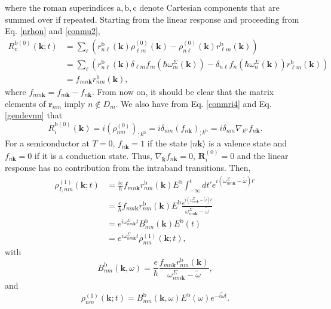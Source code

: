 where the roman superindices
$\mathrm{a},\mathrm{b},\mathrm{c}$ denote Cartesian components that are summed over if repeated.
Starting from the linear response and proceeding from Eq. \eqref{nrhon} and  \eqref{conmu2},
\begin{align}\label{R0e}
R_e^{\mathrm{b}(0)}(\mathbf{k};t)
&=
\sum_{\ell}
\left(
r^{\mathrm{b}}_{n\ell}(\mathbf{k})
\rho^{(0)}_{\ell m}(\mathbf{k})
-
\rho^{(0)}_{n\ell}(\mathbf{k})
r^{\mathrm{b}}_{\ell m}(\mathbf{k})
\right)
\nonumber \\
&=
\sum_{\ell}
\left(
r^{\mathrm{b}}_{n\ell}(\mathbf{k})
\delta_{\ell m}f_m(\hbar\omega^\Sigma_m(\mathbf{k}))
-
\delta_{n\ell}f_n(\hbar\omega^{\Sigma}_{n}(\mathbf{k}))
r^{\mathrm{b}}_{\ell m}(\mathbf{k})
\right)
\nonumber \\
&=
f_{mn\mathbf{k}}
r^{\mathrm{b}}_{nm}(\mathbf{k})
,
\end{align}
where $f_{mn\mathbf{k}}=f_{m\mathbf{k}}-f_{n\mathbf{k}}$.
From now on,
it should be clear that the matrix elements of $\mathbf{r}_{nm}$ imply
$n\notin D_m$.
We also have from Eq. \eqref{conmri4} and Eq. \eqref{gendevnn} that
\begin{equation}\label{R0i}
R_i^{\mathrm{b}(0)}(\mathbf{k})=i(\rho^{(0)}_{nm})_{;k^{\mathrm{b}}}=i\delta_{nm}(f_{n\mathbf{k}})_{;k^{\mathrm{b}}}=i\delta_{nm}\nabla_{k^{\mathrm{b}}} f_{n\mathbf{k}}
.
\end{equation}
For a semiconductor at $T = 0$, $f_{n\mathbf{k}} = 1$ if the state
$|n\mathbf{k}\rangle$ is a valence state and $f_{n\mathbf{k}} = 0$ if it is a
conduction state. Thus, $\nabla_\mathbf{k} f_{n\mathbf{k}} = 0$,
$\mathbf{R}_i^{(0)} = 0$ and the linear response has no contribution from the
intraband transitions. Then,
\begin{align}\label{rtilde2n}
\rho^{(1)}_{I,nm}(\mathbf{k};t)
&=\frac{ie}{\hbar}
f_{mn\mathbf{k}}
r^{\mathrm{b}}_{nm}(\mathbf{k})E^{\mathrm{b}}
\int_{-\infty}^t dt'
e^{i(\omega^\Sigma_{nm\mathbf{k}}-\tilde{\omega})t'}
\nonumber \\
&=\frac{e}{\hbar}
f_{mn\mathbf{k}}
r^{\mathrm{b}}_{nm}(\mathbf{k})E^{\mathrm{b}}
\frac{e^{i(\omega^\Sigma_{nm\mathbf{k}}-\tilde{\omega})t}}
{\omega^\Sigma_{nm\mathbf{k}}-\tilde{\omega}}
\nonumber \\
&=
e^{i\omega^\Sigma_{nm\mathbf{k}}t}
B^{\mathrm{b}}_{mn}(\mathbf{k})E^{\mathrm{b}}(t)
\nonumber \\
&=
e^{i\omega^\Sigma_{nm\mathbf{k}}t}
\rho^{(1)}_{nm}(\mathbf{k};t)
,
\end{align}
with
\begin{equation}\label{rho1} 
B^{\mathrm{b}}_{nm}(\mathbf{k},\omega)=
\frac{e}{\hbar}\frac{f_{mn\mathbf{k}}r^{\mathrm{b}}_{nm}(\mathbf{k})}{\omega^\Sigma_{nm\mathbf{k}}-\tilde{\omega}}
,
\end{equation} 
and
\begin{equation}\label{rhonoi1}
\rho^{(1)}_{nm}(\mathbf{k};t)=B^{\mathrm{b}}_{mn}(\mathbf{k},\omega)E^{\mathrm{b}}(\omega)e^{-i\tilde{\omega} t}
.
\end{equation}

